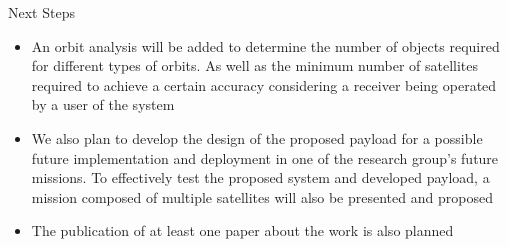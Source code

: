 %
%
%
%
%

%
%
%
%
%

\begin{frame}{Next Steps}

    \begin{itemize}
        \item An orbit analysis will be added to determine the number of objects required for different types of orbits. As well as the minimum number of satellites required to achieve a certain accuracy considering a receiver being operated by a user of the system
        \vspace{0.2cm}
        \item We also plan to develop the design of the proposed payload for a possible future implementation and deployment in one of the research group's future missions. To effectively test the proposed system and developed payload, a mission composed of multiple satellites will also be presented and proposed
        \vspace{0.2cm}
        \item The publication of at least one paper about the work is also planned
    \end{itemize}

\end{frame}
